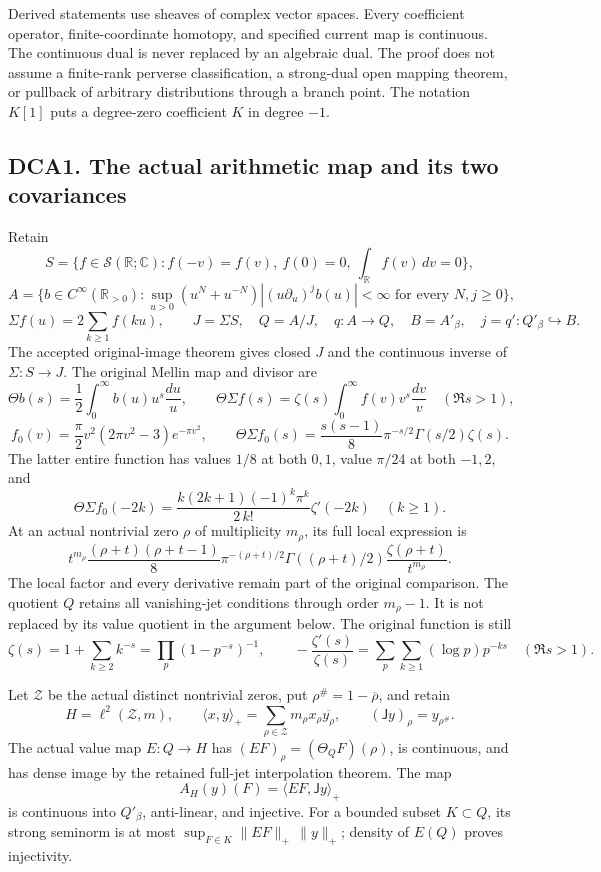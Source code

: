 Derived statements use sheaves of complex vector spaces. Every
coefficient operator, finite-coordinate homotopy, and specified current
map is continuous. The continuous dual is never replaced by an algebraic
dual. The proof does not assume a finite-rank perverse classification, a
strong-dual open mapping theorem, or pullback of arbitrary distributions
through a branch point. The notation \(K[1]\) puts a degree-zero
coefficient \(K\) in degree \(-1\).

\subsection{DCA1. The actual arithmetic map and its two
covariances}\label{dca1.-the-actual-arithmetic-map-and-its-two-covariances}

Retain \[
S=\{f\in\mathcal S(\mathbb R;\mathbb C):f(-v)=f(v),\ f(0)=0,\ \int_{\mathbb R}f(v)\,dv=0\},
\] \[
A=\{b\in C^\infty(\mathbb R_{>0}):
\sup_{u>0}(u^N+u^{-N})|(u\partial_u)^j b(u)|<\infty
\text{ for every }N,j\geq0\},
\] \[
\Sigma f(u)=2\sum_{k\geq1}f(ku),\qquad
J=\Sigma S,\quad Q=A/J,\quad q:A\to Q,\quad
B=A'_\beta,\quad j=q':Q'_\beta\hookrightarrow B.
\tag{DCA1.1}
\] The accepted original-image theorem gives closed \(J\) and the
continuous inverse of \(\Sigma:S\to J\). The original Mellin map and
divisor are \[
\Theta b(s)=\frac12\int_0^\infty b(u)u^s\frac{du}{u},\qquad
\Theta\Sigma f(s)=\zeta(s)\int_0^\infty f(v)v^s\frac{dv}{v}
\quad(\Re s>1),
\] \[
f_0(v)=\frac\pi2v^2(2\pi v^2-3)e^{-\pi v^2},\qquad
\Theta\Sigma f_0(s)=\frac{s(s-1)}8\pi^{-s/2}\Gamma(s/2)\zeta(s).
\tag{DCA1.2}
\] The latter entire function has values \(1/8\) at both \(0,1\), value
\(\pi/24\) at both \(-1,2\), and \[
\Theta\Sigma f_0(-2k)
=\frac{k(2k+1)(-1)^k\pi^k}{2\,k!}\zeta'(-2k)
\quad(k\geq1).
\tag{DCA1.3}
\] At an actual nontrivial zero \(\rho\) of multiplicity \(m_\rho\), its
full local expression is \[
t^{m_\rho}\frac{(\rho+t)(\rho+t-1)}8
\pi^{-(\rho+t)/2}\Gamma((\rho+t)/2)
\frac{\zeta(\rho+t)}{t^{m_\rho}}.
\tag{DCA1.4}
\] The local factor and every derivative remain part of the original
comparison. The quotient \(Q\) retains all vanishing-jet conditions
through order \(m_\rho-1\). It is not replaced by its value quotient in
the argument below. The original function is still \[
\zeta(s)=1+\sum_{k\geq2}k^{-s}=\prod_p(1-p^{-s})^{-1},\qquad
-\frac{\zeta'(s)}{\zeta(s)}
=\sum_p\sum_{k\geq1}(\log p)p^{-ks}\quad(\Re s>1).
\tag{DCA1.5}
\]

Let \(\mathscr Z\) be the actual distinct nontrivial zeros, put
\(\rho^\#=1-\overline\rho\), and retain \[
H=\ell^2(\mathscr Z,m),\qquad
\langle x,y\rangle_+=\sum_{\rho\in\mathscr Z}m_\rho x_\rho\overline{y_\rho},\qquad
(\mathsf Jy)_\rho=y_{\rho^\#}.
\tag{DCA1.6}
\] The actual value map \(E:Q\to H\) has
\((EF)_\rho=(\Theta_QF)(\rho)\), is continuous, and has dense image by
the retained full-jet interpolation theorem. The map \[
A_H(y)(F)=\langle EF,\mathsf Jy\rangle_+
\tag{DCA1.7}
\] is continuous into \(Q'_\beta\), anti-linear, and injective. For a
bounded subset \(K\subset Q\), its strong seminorm is at most
\(\sup_{F\in K}\|EF\|_+\,\|y\|_+\); density of \(E(Q)\) proves
injectivity.

